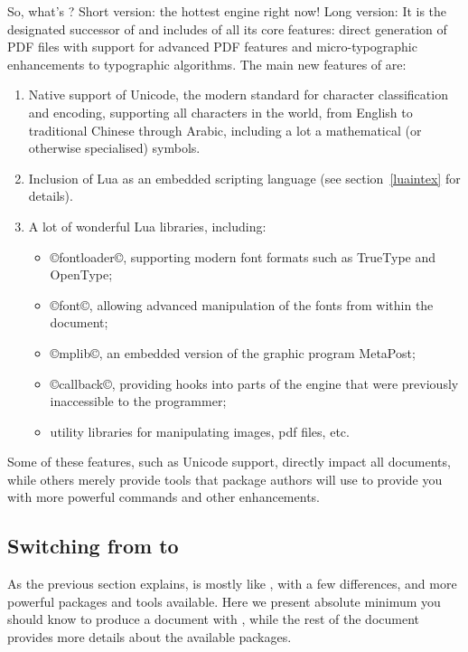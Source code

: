 \documentclass{lltxdoc}
\begin{document}
So, what's \luatex? Short version: the hottest \tex engine right now!
Long version: It is the designated successor of \pdftex and
includes of all its core features: direct generation of PDF files with support
for advanced PDF features and micro-typographic enhancements to \tex
typographic algorithms. The main new features of \luatex are:
\begin{enumerate}
  \item Native support of Unicode, the modern standard for character
    classification and encoding, supporting all characters in the world, from
    English to traditional Chinese through Arabic, including a lot a
    mathematical (or otherwise specialised) symbols.
  \item Inclusion of Lua as an embedded scripting language (see
    section~\ref{luaintex} for details).
  \item A lot of wonderful Lua libraries, including:
    \begin{itemize}
      \item ©fontloader©, supporting modern font formats such as
        TrueType and OpenType;
      \item ©font©, allowing advanced manipulation of the fonts
        from within the document;
      \item ©mplib©, an embedded version of the graphic program MetaPost;
      \item ©callback©, providing hooks into parts of the \tex engine that
        were previously inaccessible to the programmer;
      \item utility libraries for manipulating images, pdf files, etc.
    \end{itemize}
\end{enumerate}
Some of these features, such as Unicode support, directly impact all
documents, while others merely provide tools that package authors will use to
provide you with more powerful commands and other enhancements.

\subsection{Switching from \latex to \lualatex}\label{switch}

As the previous section explains, \lualatex is mostly like \latex, with a few
differences, and more powerful packages and tools available. Here we present
absolute minimum you should know to produce a document with \lualatex, while
the rest of the document provides more details about the available packages.
\end{document}
